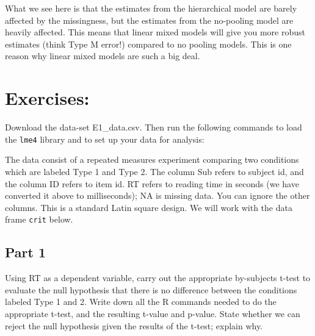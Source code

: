 \documentclass[12pt,]{krantz}
\newenvironment{Shaded}{\begin{snugshade}}{\end{snugshade}}
\newcommand{\CommentTok}[1]{\textcolor[rgb]{0.56,0.35,0.01}{\textit{#1}}}
\newcommand{\DataTypeTok}[1]{\textcolor[rgb]{0.13,0.29,0.53}{#1}}
\newcommand{\DecValTok}[1]{\textcolor[rgb]{0.00,0.00,0.81}{#1}}
\newcommand{\KeywordTok}[1]{\textcolor[rgb]{0.13,0.29,0.53}{\textbf{#1}}}
\newcommand{\NormalTok}[1]{#1}
\newcommand{\OperatorTok}[1]{\textcolor[rgb]{0.81,0.36,0.00}{\textbf{#1}}}
\newcommand{\OtherTok}[1]{\textcolor[rgb]{0.56,0.35,0.01}{#1}}
\newcommand{\StringTok}[1]{\textcolor[rgb]{0.31,0.60,0.02}{#1}}
\begin{document}
What we see here is that the estimates from the hierarchical model are barely affected by the missingness, but the estimates from the no-pooling model are heavily affected.
This means that linear mixed models will give you more robust estimates (think Type M error!) compared to no pooling models.
This is one reason why linear mixed models are such a big deal.

\hypertarget{sec:LMExercises}{%
\section{Exercises:}\label{sec:LMExercises}}

Download the data-set E1\_data.csv. Then run the following commands to load the \texttt{lme4} library and to set up your data for analysis:

\begin{Shaded}
\end{Shaded}

The data consist of a repeated measures experiment comparing two conditions which are labeled Type 1 and Type 2. The column Sub refers to subject id, and the column ID refers to item id. RT refers to reading time in seconds (we have converted it above to milliseconds); NA is missing data. You can ignore the other columns. This is a standard Latin square design. We will work with the data frame \texttt{crit} below.

\hypertarget{sec:LMExercisesPart1}{%
\subsection{Part 1}\label{sec:LMExercisesPart1}}

Using RT as a dependent variable, carry out the appropriate by-subjects t-test to evaluate the null hypothesis that there is no difference between the conditions labeled Type 1 and 2. Write down all the R commands needed to do the appropriate t-test, and the resulting t-value and p-value. State whether we can reject the null hypothesis given the results of the t-test; explain why.
\end{document}
